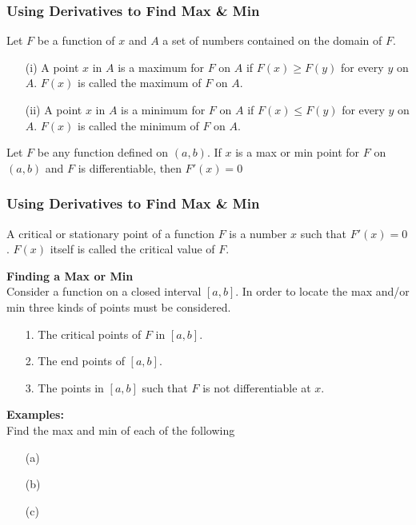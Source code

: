 \documentclass{beamer}
\begin{document}
\begin{frame}
\frametitle{\textbf{Using Derivatives to Find Max \& Min}}
Let $F$ be a function of $x$ and $A$ a set of numbers contained on the domain of $F$. 
\begin{itemize}
	\item[(i)] A point $x$ in $A$ is a maximum for $F$ on $A$ if $F(x) \geq F(y)$ for every $y$ on $A$. $F(x)$ is called the maximum of $F$ on $A$.
	\item[(ii)] A point $x$ in $A$ is a minimum for $F$ on $A$ if $F(x) \leq F(y)$ for every $y$ on $A$. $F(x)$ is called the minimum of $F$ on $A$.
\end{itemize}

\begin{theorem}
	Let $F$ be any function defined on $(a,b)$. If $x$ is a max or min point for $F$ on $(a,b)$ and $F$ is differentiable, then $F'(x)=0$
\end{theorem}
\end{frame}

\begin{frame}
\frametitle{\textbf{Using Derivatives to Find Max \& Min}}
A critical or stationary point of a function $F$ is a number $x$ such that $F'(x)=0$. $F(x)$ itself is called the critical value of $F$.

\vspace{6pt}
\textbf{Finding a Max or Min}\\
Consider a function on a closed interval $[a,b]$. In order to locate the max and/or min three kinds of points must be considered.
\begin{itemize}
	\item[1.]The critical points of $F$ in $[a,b]$.
	\item[2.]The end points of $[a,b]$.
	\item[3.]The points in $[a,b]$ such that $F$ is not differentiable at $x$.
\end{itemize}

\vspace{6pt}
\textbf{Examples:}\\
Find the max and min of each of the following
\begin{itemize}
	\item[(a)]
	\item[(b)]
	\item[(c)]
\end{itemize}
\end{frame}
\end{document}
